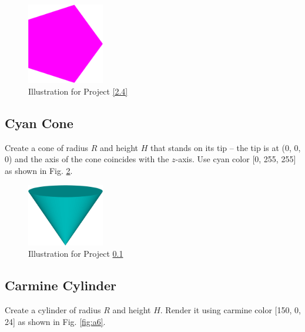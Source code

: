 \begin{figure}[!ht]
\begin{center}
\includegraphics[width=0.3\textwidth]{img/a4-pink-pentagon.png}
\end{center}
\vspace{-4mm}
\caption{Illustration for Project \ref{2.4}}
\label{fig:a4}
\vspace{-4mm}
\end{figure}




\subsection{Cyan Cone}\label{2.5}
Create a cone of radius $R$ and height $H$ that stands on its tip --
the tip is at (0, 0, 0) and the axis of the cone coincides with the 
$z$-axis. Use cyan color [0, 255, 255] as shown in Fig. \ref{fig:a5}.

\begin{figure}[!ht]
\begin{center}
\includegraphics[width=0.3\textwidth]{img/a5-cyan-cone.png}
\end{center}
\vspace{-4mm}
\caption{Illustration for Project \ref{2.5}}
\label{fig:a5}
\end{figure}


\subsection{Carmine Cylinder}\label{2.6}
Create a cylinder of radius $R$ and height $H$.
Render it using carmine color [150, 0, 24]
as shown in Fig. \ref{fig:a6}.
\newpage

